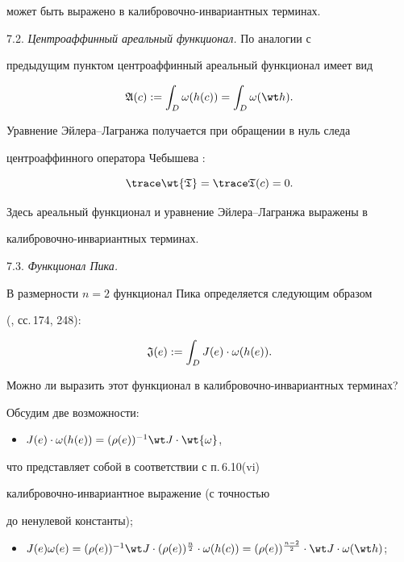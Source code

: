может быть выражено в калибровочно-инвариантных терминах.

\medskip



7.2. {\it Центроаффинный ареальный функционал.} По аналогии с 

предыдущим пунктом центроаффинный ареальный функционал имеет вид

$$

\frak {A} (c) := \int_D \omega(h(c)) = \int_D \omega(\wt h).

$$

Уравнение Эйлера--Лагранжа получается при обращении в нуль следа

центроаффинного оператора Чебышева \cite{WANG}:

$$

\trace \wt {\frak T} = \trace \frak T (c) = 0.

$$

Здесь ареальный функционал и уравнение Эйлера--Лагранжа выражены в

калибровочно-ин\-ва\-ри\-ант\-ных терминах.

\medskip



7.3. {\it Функционал Пика.}

В размерности $n=2$ функционал Пика определяется следующим образом

(\cite{BLA}, сс.\,174, 248):

$$

\frak J(e) := \int_D J(e) \cdot \omega (h(e)).

$$

Можно ли выразить этот функционал в калибровочно-инвариантных терминах?

Обсудим две возможности:

\begin{itemize}

\item[(i)]

$J(e) \cdot \omega (h(e)) =(\rho (e))^{-1} \wt J \cdot \wt {\omega}$,

\end{itemize}

что представляет собой в соответствии с п.\,6.10(vi)

калибровочно-инвариантное выражение (с точностью

до ненулевой константы);

\begin{itemize}

\item[(ii)]

$J(e) \omega (e) = (\rho (e))^{-1} \wt J \cdot (\rho

(e))^{\frac {n}{2}} \cdot\omega (h(c)) = (\rho (e))^{\frac {n-2}{2}}

\cdot \wt J \cdot \omega (\wt h)$;

\end{itemize}

